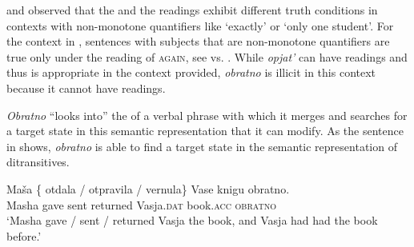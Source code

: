 \documentclass[output=paper]{langscibook}
\begin{document}
\noindent \citet{Alexiadou-etal2014} and \citet{Lechner-etal2015} observed that the  and the  readings exhibit different truth conditions in contexts with non-monotone quantifiers like ‘exactly' or `only one student’. For the context in , sentences with subjects that are non-monotone quantifiers are true only under the  reading of \textsc{again}, see  vs. . While \textit{opjat’} can have  readings and thus  is appropriate in the context provided, \textit{obratno} is illicit in this context because it cannot have  readings.



\textit{Obratno} “looks into” the  of a verbal phrase with which it merges and searches for a target state in this semantic representation that it can modify. As the sentence in  shows, \textit{obratno} is able to find a target state in the semantic representation of  ditransitives.


 \ea\label{ex:bondarenko:20}
\gll Maša \{\hspace{-2pt} otdala / otpravila / vernula\} Vase knigu obratno.\\
     Masha {} gave {} sent {} returned Vasja.\textsc{dat} book.\textsc{acc} \textsc{obratno}\\
\glt `Masha gave / sent / returned Vasja the book, and Vasja had had the book before.'
\z
\end{document}
